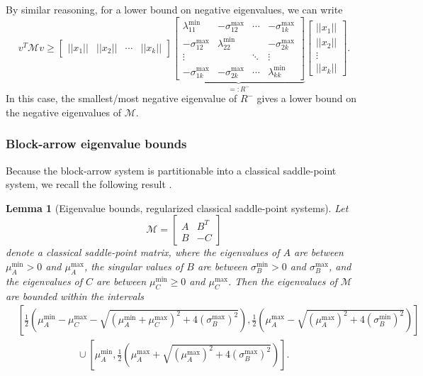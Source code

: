 \documentclass{article}
\newtheorem{lemma}{Lemma}
\begin{document}
By similar reasoning, for a lower bound on negative eigenvalues, we can write
\begin{equation*}
	v^T \mathcal{M} v \ge \begin{bmatrix} ||x_1|| & ||x_2|| & \cdots & ||x_k|| \end{bmatrix} \underbrace{\begin{bmatrix}
			\lambda_{11}^{\min}& -\sigma_{12}^{\max} &  \cdots & -\sigma_{1k}^{\max} \\
			-\sigma_{12}^{\max} & \lambda_{22}^{\min} & & -\sigma_{2k}^{\max}\\
			\vdots & & \ddots &  \vdots \\
			-\sigma_{1k}^{\max} & -\sigma_{2k}^{\max} & \cdots  & \lambda_{kk}^{\min}
	\end{bmatrix}}_{=: R^-} \begin{bmatrix}
		||x_1|| \\
		||x_2|| \\
		\vdots \\
		||x_k||
	\end{bmatrix}.
\end{equation*}
In this case, the smallest/most negative eigenvalue of $R^{-}$ gives a lower bound on the negative eigenvalues of $\mathcal{M}$.

\subsubsection{Block-arrow eigenvalue bounds}

Because the block-arrow system is partitionable into a classical saddle-point system, we recall the following result \cite[Lemma 2.2]{sw94}.

\begin{lemma}[Eigenvalue bounds, regularized classical saddle-point systems]
    Let
    \[
    \mathcal{M} = \begin{bmatrix}
        A & B^T \\
        B & -C
    \end{bmatrix}
    \]
    denote a classical saddle-point matrix, where the eigenvalues of $A$ are between $\mu_A^{\min} >0$ and $\mu_A^{\max}$, the singular values of $B$ are between $\sigma_B^{\min} > 0$ and $\sigma_B^{\max}$, and the eigenvalues of $C$ are between $\mu_C^{\min} \ge 0$ and $\mu_C^{\max}$. Then the eigenvalues of $\mathcal{M}$ are bounded within the intervals
    {\small
    \begin{align*}
        &\left[ \frac12 \left( \mu_A^{\min} -\mu_C^{\max} - \sqrt{(\mu_A^{\min} + \mu_C^{\max})^2 + 4 (\sigma_B^{\max})^2} \right),\frac12\left( \mu_A^{\max} - \sqrt{(\mu_A^{\max})^2 + 4 (\sigma_B^{\min})^2 } \right) \right]\\
        &\qquad \qquad \qquad\cup \left[ \mu_A^{\min}, \frac12 \left( \mu_A^{\max} + \sqrt{(\mu_A^{\max})^2 + 4(\sigma_B^{\max})^2} \right) \right].
    \end{align*}}
    \label{lem:sp-eig-bounds}
\end{lemma}
\end{document}
